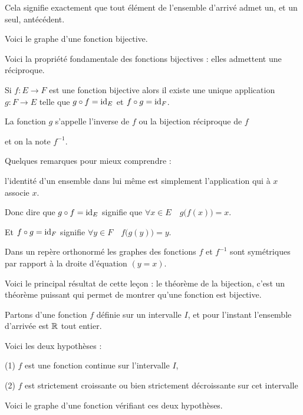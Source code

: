 Cela signifie exactement que tout élément de l'ensemble d'arrivé admet un, et un seul, antécédent.

Voici le graphe d'une fonction bijective.

\diapo

Voici la propriété fondamentale des fonctions bijectives : elles admettent une réciproque.


Si $f :  E \to F$ est une fonction bijective alors il existe une 
unique application $g : F \to E$ telle que $g\circ f = \mathop{\text{id}}\nolimits_E$ et $f\circ g = \mathop{\text{id}}\nolimits_F$.

La fonction $g$ s’appelle l'inverse de $f$ ou la bijection réciproque de $f$ 

et on la note $f^{-1}$.

\change


Quelques remarques pour mieux comprendre :

l'identité d'un ensemble dans lui même est simplement l'application qui à $x$ associe $x$.

\change

Donc dire que $g \circ f = \mathop{\text{id}}\nolimits_E$ signifie que $\forall x \in E\quad  g\big(f(x)\big) = x$.


\change

Et $f \circ g = \mathop{\text{id}}\nolimits_F$  signifie  $\forall y \in F\quad  f\big(g(y)\big) = y$.

\change

Dans un repère orthonormé les graphes des fonctions $f$ et $f^{-1}$ sont symétriques 
  par rapport à la droite d'équation $(y=x)$.
  
  
  
\diapo

Voici le principal résultat de cette leçon : le théorème de la bijection, c'est un théorème 
puissant qui permet de montrer qu'une fonction est bijective.


Partons d'une fonction $f$ définie sur un intervalle $I$, et pour l'instant l'ensemble d'arrivée est $\mathbb{R}$ tout entier.

Voici les deux hypothèses :

(1) $f$ est une fonction continue sur l'intervalle $I$,

(2) $f$ est strictement croissante ou bien strictement décroissante sur cet intervalle

Voici le graphe d'une fonction vérifiant ces deux hypothèses.

\change

